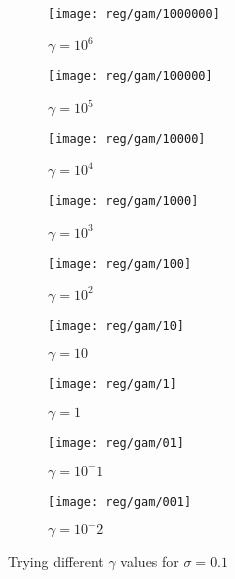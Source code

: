\documentclass[conference,compsoc]{IEEEtran}
\begin{document}
\begin{figure}[htb]
    \centering %

\begin{subfigure}{0.33\textwidth}
  \texttt{[image: reg/gam/1000000]}
  \caption{$\gamma =10^6$}
  \label{fig:4}
\end{subfigure}\hfil %
\begin{subfigure}{0.33\textwidth}
  \texttt{[image: reg/gam/100000]}
   \caption{$\gamma =10^5$}
  \label{fig:5}
\end{subfigure}\hfil %
\begin{subfigure}{0.33\textwidth}
  \texttt{[image: reg/gam/10000]}
    \caption{$\gamma =10^4$}
  \label{fig:6}
\end{subfigure}

\begin{subfigure}{0.33\textwidth}
  \texttt{[image: reg/gam/1000]}
  \caption{$\gamma =10^3$}
  \label{fig:4}
\end{subfigure}\hfil %
\begin{subfigure}{0.33\textwidth}
  \texttt{[image: reg/gam/100]}
  \caption{$\gamma =10^2$}
  \label{fig:5}
\end{subfigure}\hfil %
\begin{subfigure}{0.33\textwidth}
  \texttt{[image: reg/gam/10]}
   \caption{$\gamma =10$}
  \label{fig:6}
\end{subfigure}
\begin{subfigure}{0.33\textwidth}
  \texttt{[image: reg/gam/1]}
  \caption{$\gamma =1$}
  \label{fig:1}
\end{subfigure}\hfil %
\begin{subfigure}{0.33\textwidth}
  \texttt{[image: reg/gam/01]}
  \caption{$\gamma =10^-1$}
  \label{fig:2}
\end{subfigure}\hfil %
\begin{subfigure}{0.33\textwidth}
  \texttt{[image: reg/gam/001]}
  \caption{$\gamma =10^-2$}
  \label{fig:3}
\end{subfigure}

\caption{Trying different $\gamma$ values for $\sigma = 0.1$}
\label{fig:regam}
\end{figure}
\end{document}
